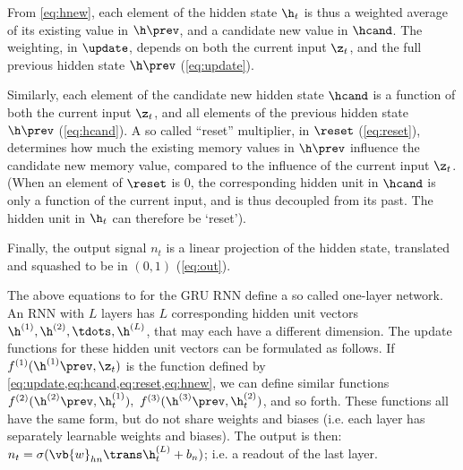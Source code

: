 From \cref{eq:hnew}, each element of the hidden state $\h_t$ is thus a weighted average of its existing value in $\h\prev$, and a candidate new value in $\hcand$. The weighting, in $\update$, depends on both the current input $\z_t$, and the full previous hidden state $\h\prev$ (\cref{eq:update}).

Similarly, each element of the candidate new hidden state $\hcand$ is a function of both the current input $\z_t$, and all elements of the previous hidden state $\h\prev$ (\cref{eq:hcand}). A so called ``reset'' multiplier, in $\reset$ (\cref{eq:reset}), determines how much the existing memory values in $\h\prev$ influence the candidate new memory value, compared to the influence of the current input $\z_t$. (When an element of $\reset$ is $0$, the corresponding hidden unit in $\hcand$ is only a function of the current input, and is thus decoupled from its past. The hidden unit in $\h_t$ can therefore be `reset').

Finally, the output signal $n_t$ is a linear projection of the hidden state, translated and squashed to be in $(0, 1)$ (\cref{eq:out}).

The above equations  to  for the GRU RNN define a so called one-layer network.\footnotemark{} An RNN with $L$ layers has $L$ corresponding hidden unit vectors $\h^{(1)}, \h^{(2)}, \tdots, \h^{(L)}$, that may each have a different dimension. The update functions for these hidden unit vectors can be formulated as follows. If $f^{(1)}(\h^{(1)}\prev, \z_t)$ is the function defined by \cref{eq:update,eq:hcand,eq:reset,eq:hnew}, we can define similar functions $f^{(2)}(\h^{(2)}\prev, \h^{(1)}_t), \  f^{(3)}(\h^{(3)}\prev, \h^{(2)}_t)$, and so forth. These functions all have the same form, but do not share weights and biases (i.e. each layer has separately learnable weights and biases). The output is then: $n_t = \sigma( \vb{w}_{hn}\trans \h^{(L)}_t + b_n )$; i.e. a readout of the last layer.

